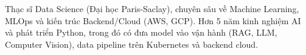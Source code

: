 

\begin{cvparagraph}

Thạc sĩ Data Science (Đại học Paris-Saclay), chuyên sâu về Machine Learning, MLOps và kiến trúc Backend/\allowbreak Cloud (AWS, GCP). Hơn 5 năm kinh nghiệm AI và phát triển Python, trong đó có đưa model vào vận hành (RAG, LLM, Computer Vision), data pipeline trên Kubernetes và backend cloud.
\end{cvparagraph}

